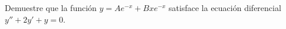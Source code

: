 \item Demuestre que la función $y = Ae^{-x} + Bxe^{-x}$ satisface la ecuación diferencial $y'' + 2y' + y = 0$.
